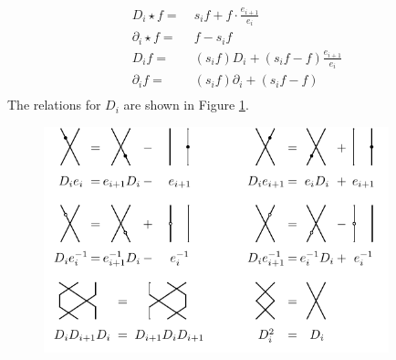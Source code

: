 \documentclass[reqno,11pt]{book}
\numberwithin{equation}{section}
\theoremstyle{plain}
\theoremstyle{plain}
\numberwithin{equation}{section}
\theoremstyle{remark}
\begin{document}
\begin{equation*}
\begin{aligned}
  D_i \star f =\;& s_i f + f\cdot \frac{e_{i+1}}{e_{i}}\\ 
  \partial_i \star f =\;& f -s_i f\\
  D_i f =\;& (s_i f) D_i + (s_i f-f) \frac{e_{i+1}}{e_i}\\ 
  \partial_i f =\;& (s_i f) \partial_i + (s_i f-f)\\   
\end{aligned}
\end{equation*}
The relations for $D_i$ are shown in Figure \ref{fig:relations_3}.
\begin{figure}[ht]
  \vspace{0cm}
    \centering  
    \includegraphics[width=10cm]{figures/strands/relations_1.pdf}
    \caption{}
      \label{fig:relations_3}        
\end{figure}
\end{document}
